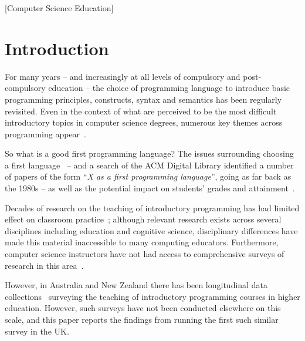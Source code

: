 \documentclass{sig-alternate}
\begin{document}
[Computer Science Education]

\section{Introduction}\label{intro}

For many years -- and increasingly at all levels of compulsory and
post-compulsory education -- the choice of programming language to
introduce basic programming principles, constructs, syntax and
semantics has been regularly revisited. Even in the context of what
are perceived to be the most difficult introductory topics in computer
science degrees, numerous key themes across programming
appear~\cite{dale:2006}. 

So what is a good first programming language? The issues surrounding
choosing a first language~\cite{gupta:2004,kaplan:2010} -- and a
search of the ACM Digital Library identified a number of papers of the
form ``{\emph{X as a first programming language}}'', going as far back
as the 1980s -- as well as the potential impact on students' grades
and attainment~\cite{ivanovic-et-al:2015}.

Decades of research on the teaching of introductory programming has
had limited effect on classroom practice~\cite{pears-et-al:2007};
although relevant research exists across several disciplines including
education and cognitive science, disciplinary differences have made
this material inaccessible to many computing educators. Furthermore,
computer science instructors have not had access to comprehensive
surveys of research in this
area~\cite{mccracken-et-al:2001,pears-et-al:2007}.

However, in Australia and New Zealand there has been longitudinal data
collections~\cite{deraadt-et-al:2004,mason-et-al:2012,mason+cooper:2014}
surveying the teaching of introductory programming courses in higher
education. However, such surveys have not been conducted elsewhere on
this scale, and this paper reports the findings from running the first
such similar survey in the UK.
\end{document}
